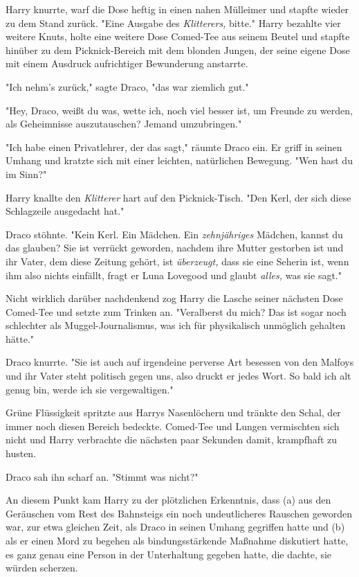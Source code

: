 {Harry knurrte, warf die Dose heftig in einen nahen Mülleimer und stapfte wieder zu dem Stand zurück. "Eine Ausgabe des \emph{Klitterers,} bitte." Harry bezahlte vier weitere Knuts, holte eine weitere Dose Comed-Tee aus seinem Beutel und stapfte hinüber zu dem Picknick-Bereich mit dem blonden Jungen, der seine eigene Dose mit einem Ausdruck aufrichtiger Bewunderung anstarrte.

"Ich nehm's zurück," sagte Draco, "das war ziemlich gut."

"Hey, Draco, weißt du was, wette ich, noch viel besser ist, um Freunde zu werden, als Geheimnisse auszutauschen? Jemand umzubringen."

"Ich habe einen Privatlehrer, der das sagt," räumte Draco ein. Er griff in seinen Umhang und kratzte sich mit einer leichten, natürlichen Bewegung. "Wen hast du im Sinn?"

Harry knallte den \emph{Klitterer} hart auf den Picknick-Tisch. "Den Kerl, der sich diese Schlagzeile ausgedacht hat."

Draco stöhnte. "Kein Kerl. Ein Mädchen. Ein \emph{zehnjähriges} Mädchen, kannst du das glauben? Sie ist verrückt geworden, nachdem ihre Mutter gestorben ist und ihr Vater, dem diese Zeitung gehört, ist \emph{überzeugt,} dass sie eine Seherin ist, wenn ihm also nichts einfällt, fragt er Luna Lovegood und glaubt \emph{alles,} was sie sagt."

Nicht wirklich darüber nachdenkend zog Harry die Lasche seiner nächsten Dose Comed-Tee und setzte zum Trinken an. "Veralberst du mich? Das ist sogar noch schlechter als Muggel-Journalismus, was ich für physikalisch unmöglich gehalten hätte."

Draco knurrte. "Sie ist auch auf irgendeine perverse Art besessen von den Malfoys und ihr Vater steht politisch gegen uns, also druckt er jedes Wort. So bald ich alt genug bin, werde ich sie vergewaltigen."

Grüne Flüssigkeit spritzte aus Harrys Nasenlöchern und tränkte den Schal, der immer noch diesen Bereich bedeckte. Comed-Tee und Lungen vermischten sich nicht und Harry verbrachte die nächsten paar Sekunden damit, krampfhaft zu husten.

Draco sah ihn scharf an. "Stimmt was nicht?"

An diesem Punkt kam Harry zu der plötzlichen Erkenntnis, dass (a) aus den Geräuschen vom Rest des Bahnsteigs ein noch undeutlicheres Rauschen geworden war, zur etwa gleichen Zeit, als Draco in seinen Umhang gegriffen hatte und (b) als er einen Mord zu begehen als bindungsstärkende Maßnahme diskutiert hatte, es ganz genau eine Person in der Unterhaltung gegeben hatte, die dachte, sie würden scherzen.

}
